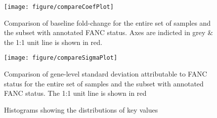 \documentclass{article}\usepackage{knitr}
\begin{document}
\begin{knitrout}
\color{fgcolor}\begin{figure}[]


{\centering \texttt{[image: figure/compareCoefPlot]} 

}

\caption[Comparison of baseline fold-change for the entire set of samples and the subset with annotated FANC status]{Comparison of baseline fold-change for the entire set of samples and the subset with annotated FANC status. Axes are indicted in grey \& the 1:1 unit line is shown in red.\label{fig:compareCoefPlot}}
\end{figure}


\end{knitrout}

\begin{knitrout}
\color{fgcolor}\begin{figure}[]


{\centering \texttt{[image: figure/compareSigmaPlot]} 

}

\caption[Comparison of gene-level standard deviation attributable to FANC status for the entire set of samples and the subset with annotated FANC status]{Comparison of gene-level standard deviation attributable to FANC status for the entire set of samples and the subset with annotated FANC status. The 1:1 unit line is shown in red\label{fig:compareSigmaPlot}}
\end{figure}


\end{knitrout}

\begin{knitrout}
\color{fgcolor}\begin{figure}[]
\caption[Histograms showing the distributions of key values]{Histograms showing the distributions of key values\label{fig:fancHistograms}}
\end{figure}


\end{knitrout}
\end{document}
